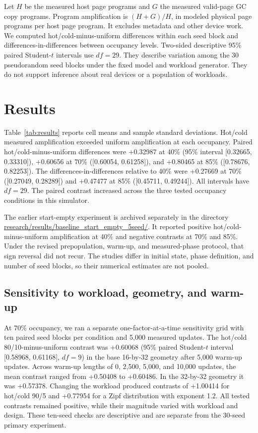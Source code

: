 \documentclass[11pt]{article}
\begin{document}
Let $H$ be the measured host page programs and $G$ the measured valid-page GC copy programs. Program amplification is $(H+G)/H$, in modeled physical page programs per host page program. It excludes metadata and other device work. We computed hot/cold-minus-uniform differences within each seed block and differences-in-differences between occupancy levels. Two-sided descriptive 95\% paired Student-$t$ intervals use $df=29$. They describe variation among the 30 pseudorandom seed blocks under the fixed model and workload generator. They do not support inference about real devices or a population of workloads.

\section{Results}
Table~\ref{tab:results} reports cell means and sample standard deviations. Hot/cold measured amplification exceeded uniform amplification at each occupancy. Paired hot/cold-minus-uniform differences were +0.32987 at 40\% (95\% interval [0.32665, 0.33310]), +0.60656 at 70\% ([0.60054, 0.61258]), and +0.80465 at 85\% ([0.78676, 0.82253]). The differences-in-differences relative to 40\% were +0.27669 at 70\% ([0.27049, 0.28289]) and +0.47477 at 85\% ([0.45711, 0.49244]). All intervals have $df=29$. The paired contrast increased across the three tested occupancy conditions in this simulator.

The earlier start-empty experiment is archived separately in the directory \url{research/results/baseline_start_empty_5seed/}. It reported positive hot/cold-minus-uniform amplification at 40\% and negative contrasts at 70\% and 85\%. Under the revised prepopulation, warm-up, and measured-phase protocol, that sign reversal did not recur. The studies differ in initial state, phase definition, and number of seed blocks, so their numerical estimates are not pooled.

\subsection{Sensitivity to workload, geometry, and warm-up}
At 70\% occupancy, we ran a separate one-factor-at-a-time sensitivity grid with ten paired seed blocks per condition and 5,000 measured updates. The hot/cold 80/10-minus-uniform contrast was +0.60068 (95\% paired Student-$t$ interval [0.58968, 0.61168], $df=9$) in the base 16-by-32 geometry after 5,000 warm-up updates. Across warm-up lengths of 0, 2,500, 5,000, and 10,000 updates, the mean contrast ranged from +0.50408 to +0.60486. In the 32-by-32 geometry it was +0.57378. Changing the workload produced contrasts of +1.00414 for hot/cold 90/5 and +0.77954 for a Zipf distribution with exponent 1.2. All tested contrasts remained positive, while their magnitude varied with workload and design. These ten-seed checks are descriptive and are separate from the 30-seed primary experiment.
\end{document}
